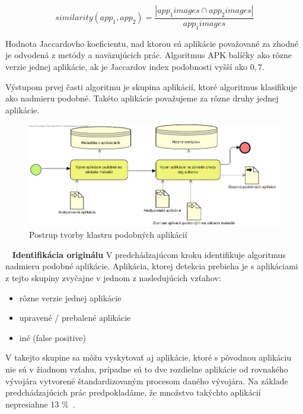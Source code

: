 \[ similarity(app_1, app_2) = \frac{|app_{1}images \cap app_{2}images|} { app_{1}images} \]

Hodnota Jaccardovho koeficientu, nad ktorou sú aplikácie považované za zhodné je odvodená z metódy  a naväzujúcich prác. Algoritmus APK balíčky ako rôzne verzie jednej aplikácie, ak je Jaccardov index podobnosti vyšší ako $0,7$.

Výstupom prvej časti algoritmu je skupina aplikácií, ktoré algoritmus klasifikuje ako nadmieru podobné. Takéto aplikácie považujeme za rôzne druhy jednej aplikácie.

\begin{figure}[htb]
  \begin{center}
    \includegraphics[width=130mm]{images/detection-cluster.png}
  \end{center}
  \caption{Postrup tvorby klastru podobných aplikácií}
  \label{fig:detectionClustering}
\end{figure}
\ \newline \newline
\noindent \textbf{Identifikácia originálu} \newline \newline
\noindent V predchádzajúcom kroku identifikuje algoritmus nadmieru podobné aplikácie. Aplikácia, ktorej detekcia prebieha je s aplikáciami z tejto skupiny zvyčajne v jednom z nasledujúcich vzťahov:
\begin{itemize}
	\item rôzne verzie jednej aplikácie
	\item upravené / prebalené aplikácie
	\item iné (false positive)
\end{itemize}
V takejto skupine sa môžu vyskytovať aj aplikácie, ktoré s pôvodnou aplikáciu nie sú v žiadnom vzťahu, prípadne sú to dve rozdielne aplikácie od rovnakého vývojára vytvorené štandardizovaným procesom daného vývojára. Na základe predchádzajúcich prác predpokladáme, že množstvo takýchto aplikácií nepresiahne 13 \%~\cite{Zhou2012}.

